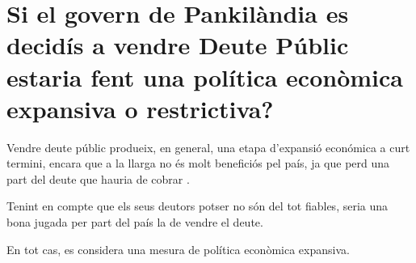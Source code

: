 \section{Si el govern de Pankilàndia es decidís a vendre Deute Públic 
estaria fent una política econòmica expansiva o restrictiva?}

Vendre deute públic produeix, en general, una etapa d'expansió
económica a curt termini, encara que a la llarga no és molt beneficiós
pel país, ja que perd una part del deute que hauria de cobrar
\cite{selling_debt}.

Tenint en compte que els seus deutors potser no són del tot fiables, 
seria una bona jugada per part del país la de vendre el deute.

En tot cas, es considera una mesura de política econòmica expansiva.
